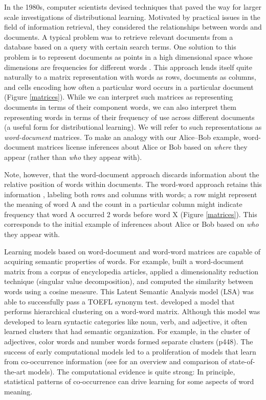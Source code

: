 \documentclass[man,floatsintext]{apa6}
\begin{document}
In the 1980s, computer scientists devised techniques that paved the way for larger scale investigations of distributional learning. Motivated by practical issues in the field of information retrieval, they considered the relationships between words and documents. A typical  problem was to retrieve relevant documents from a database based on a query with certain search terms. One solution to this problem is to represent documents as points in a high dimensional space whose dimensions are frequencies for different words \citep{salton1983}. This approach lends itself quite naturally to a matrix representation with words as rows, documents as columns, and cells encoding how often a particular word occurs in a particular document (Figure \ref{matrices}). While we can interpret such matrices as representing documents in terms of their component words, we can also interpret them representing words in terms of their frequency of use across different documents (a useful form for distributional learning). We will refer to such representations as \emph{word-document} matrices. To make an analogy with our Alice--Bob example, word-document matrices license inferences about Alice or Bob based on \emph{where} they appear (rather than \emph{who} they appear with).

Note, however, that the word-document approach discards information about the relative position of words within documents. The word-word approach retains this information \citep{church1990, schutze1992}, labeling both rows and columns with words; a row might represent the meaning of word A and the count in a particular column might indicate frequency that word A occurred 2 words before word X (Figure \ref{matrices}). This corresponds to the initial example of inferences about Alice or Bob based on \emph{who} they appear with.

Learning models based on word-document and word-word matrices are capable of acquiring semantic properties of words. For example, \citet{landauer1997} built a word-document matrix from a corpus of encyclopedia articles, applied a dimensionality reduction technique (singular value decomposition), and computed the similarity between words using a cosine measure. This Latent Semantic Analysis model (LSA) was able to successfully pass a TOEFL synonym test. \citet{redington1998} developed a model that performs hierarchical clustering on a word-word matrix. Although this model was developed to learn syntactic categories like noun, verb, and adjective, it often learned clusters that had semantic organization. For example, in the cluster of adjectives, color words and number words formed separate clusters (p448). The success of early computational models led to a proliferation of models that learn from co-occurrence information (see \citealp{riordan2010} for an overview and comparison of state-of-the-art models). The computational evidence is quite strong: In principle, statistical patterns of co-occurrence can  drive learning for some aspects of word meaning.
\end{document}
